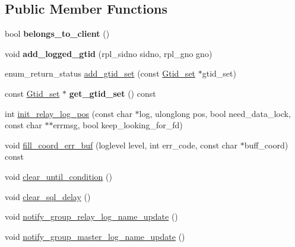 \subsection*{Public Member Functions}
\begin{DoxyCompactItemize}
\item 
\mbox{\label{classRelay__log__info_a80ee7108bc7cbdf1df4025c266147514}} 
bool {\bfseries belongs\+\_\+to\+\_\+client} ()
\item 
\mbox{\label{classRelay__log__info_a523b1810022f40f6c67605e6b35c89e3}} 
void {\bfseries add\+\_\+logged\+\_\+gtid} (rpl\+\_\+sidno sidno, rpl\+\_\+gno gno)
\item 
enum\+\_\+return\+\_\+status \mbox{\hyperlink{classRelay__log__info_a514a40d969720a66682e708c96d95f83}{add\+\_\+gtid\+\_\+set}} (const \mbox{\hyperlink{classGtid__set}{Gtid\+\_\+set}} $\ast$gtid\+\_\+set)
\item 
\mbox{\label{classRelay__log__info_aa5ac490e962add1bd99e03cd92a0ccea}} 
const \mbox{\hyperlink{classGtid__set}{Gtid\+\_\+set}} $\ast$ {\bfseries get\+\_\+gtid\+\_\+set} () const
\item 
int \mbox{\hyperlink{classRelay__log__info_aec9eae2f70577d73ee930cd8223f5233}{init\+\_\+relay\+\_\+log\+\_\+pos}} (const char $\ast$log, ulonglong pos, bool need\+\_\+data\+\_\+lock, const char $\ast$$\ast$errmsg, bool keep\+\_\+looking\+\_\+for\+\_\+fd)
\item 
void \mbox{\hyperlink{classRelay__log__info_a50435403f8892d869a5b3ddcc4647234}{fill\+\_\+coord\+\_\+err\+\_\+buf}} (loglevel level, int err\+\_\+code, const char $\ast$buff\+\_\+coord) const
\item 
void \mbox{\hyperlink{classRelay__log__info_a8b1c765fea358e45de13c29ba9f778a2}{clear\+\_\+until\+\_\+condition}} ()
\item 
void \mbox{\hyperlink{classRelay__log__info_a8c111e744f81a92f66b54efc06b48995}{clear\+\_\+sql\+\_\+delay}} ()
\item 
void \mbox{\hyperlink{classRelay__log__info_ac73b919ab5c4fc95d32307c757ad39f3}{notify\+\_\+group\+\_\+relay\+\_\+log\+\_\+name\+\_\+update}} ()
\item 
void \mbox{\hyperlink{classRelay__log__info_a8b38e96443b2adc87210a39ac7b831a8}{notify\+\_\+group\+\_\+master\+\_\+log\+\_\+name\+\_\+update}} ()
\item 
$$
\end{DoxyCompactItemize}
